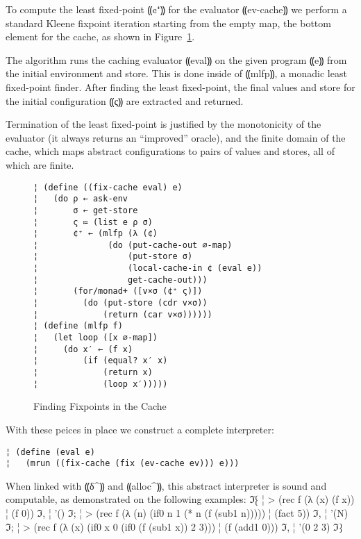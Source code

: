 To compute the least fixed-point ⸨¢⁺⸩ for the evaluator ⸨ev-cache⸩ we perform a
standard Kleene fixpoint iteration starting from the empty map, the bottom
element for the cache, as shown in Figure~\ref{f:fixing}.

The algorithm runs the caching evaluator ⸨eval⸩ on the given program ⸨e⸩ from
the initial environment and store. This is done inside of ⸨mlfp⸩, a monadic
least fixed-point finder. After finding the least fixed-point, the final values
and store for the initial configuration ⸨ς⸩ are extracted and returned.

Termination of the least fixed-point is justified by the monotonicity of the
evaluator (it always returns an “improved” oracle), and the finite domain of
the cache, which maps abstract configurations to pairs of values and stores,
all of which are finite.

\begin{figure} %
\begin{lstlisting}
¦ (define ((fix-cache eval) e)  
¦   (do ρ ← ask-env
¦       σ ← get-store
¦       ς ≔ (list e ρ σ)
¦       ¢⁺ ← (mlfp (λ (¢) 
¦              (do (put-cache-out ∅-map)
¦                  (put-store σ)
¦                  (local-cache-in ¢ (eval e))
¦                  get-cache-out)))
¦       (for/monad+ ([v×σ (¢⁺ ς)])
¦         (do (put-store (cdr v×σ))
¦             (return (car v×σ))))))
¦ (define (mlfp f)
¦   (let loop ([x ∅-map])
¦     (do x′ ← (f x)
¦         (if (equal? x′ x)
¦             (return x)
¦             (loop x′)))))
\end{lstlisting}
\caption{Finding Fixpoints in the Cache}
\label{f:fixing}
\end{figure} %

With these peices in place we construct a complete interpreter:
\begin{lstlisting}
¦ (define (eval e)
¦   (mrun ((fix-cache (fix (ev-cache ev))) e)))
\end{lstlisting}
When linked with ⸨δ^⸩ and ⸨alloc^⸩, this abstract interpreter is sound and
computable, as demonstrated on the following examples:
ℑ⁅
¦ > (rec f (λ (x) (f x))
¦     (f 0))
ℑ,
¦ '()
ℑ;
¦ > (rec f (λ (n) (if0 n 1 (* n (f (sub1 n)))))
¦     (fact 5))
ℑ,
¦ '(N)
ℑ;
¦ > (rec f (λ (x) (if0 x 0 (if0 (f (sub1 x)) 2 3)))
¦      (f (add1 0)))
ℑ,
¦ '(0 2 3)
ℑ⁆

